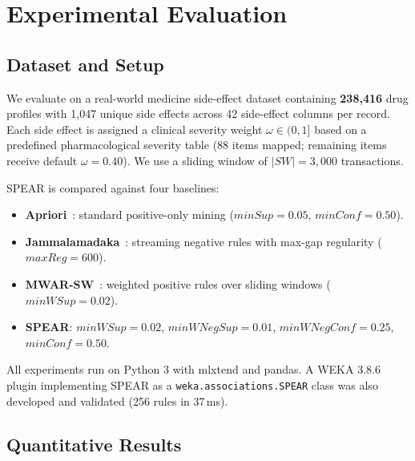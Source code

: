 \documentclass[10pt,twocolumn]{article}
\theoremstyle{plain}
\theoremstyle{definition}
\theoremstyle{remark}
\newcommand{\minSup}{\mathit{minSup}}
\newcommand{\minConf}{\mathit{minConf}}
\newcommand{\SW}{\mathit{SW}}
\begin{document}
\section{Experimental Evaluation}
\label{sec:experiments}

\subsection{Dataset and Setup}

We evaluate on a real-world medicine side-effect dataset containing
\textbf{238{,}416} drug profiles with 1{,}047 unique side effects
across 42 side-effect columns per record.
Each side effect is assigned a clinical severity weight
$\omega \in (0,1]$ based on a predefined pharmacological severity
table (88 items mapped; remaining items receive default
$\omega = 0.40$).
We use a sliding window of $|\SW| = 3{,}000$ transactions.

SPEAR is compared against four baselines:
\begin{itemize}[leftmargin=*]
  \item \textbf{Apriori}~\cite{agrawal1994}: standard positive-only mining
        ($\minSup = 0.05$, $\minConf = 0.50$).
  \item \textbf{Jammalamadaka}~\cite{sastry2025}: streaming negative rules
        with max-gap regularity ($\mathit{maxReg} = 600$).
  \item \textbf{MWAR-SW}~\cite{ouyang2015}: weighted positive rules over
        sliding windows ($\mathit{minWSup} = 0.02$).
  \item \textbf{SPEAR}: $\mathit{minWSup} = 0.02$, $\mathit{minWNegSup} = 0.01$,
        $\mathit{minWNegConf} = 0.25$, $\minConf = 0.50$.
\end{itemize}

All experiments run on Python 3 with mlxtend and pandas.
A WEKA 3.8.6 plugin implementing SPEAR as a \texttt{weka.associations.SPEAR}
class was also developed and validated (256 rules in 37\,ms).

\subsection{Quantitative Results}
\end{document}
